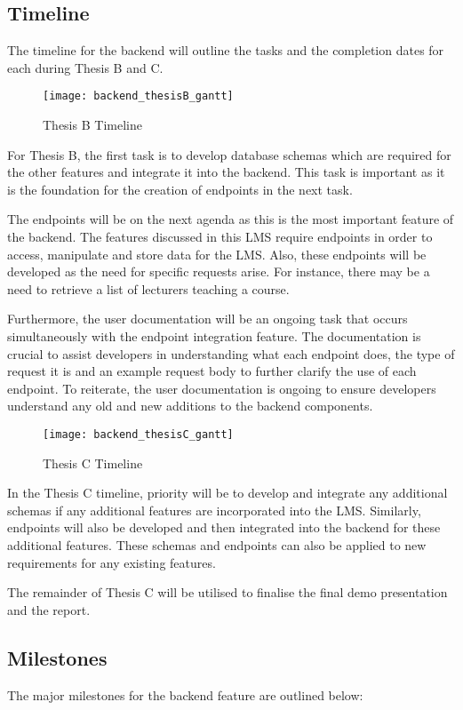\subsection{Timeline}
The timeline for the backend will outline the tasks and the completion dates for each during Thesis B and C.

\begin{figure}[h!]
    \centering
    \texttt{[image: backend\_thesisB\_gantt]}
    \caption{Thesis B Timeline}
\end{figure}

For Thesis B, the first task is to develop database schemas which are required for the other features and integrate 
it into the backend. This task is important as it is the foundation for the creation of endpoints in the next task. 

The endpoints will be on the next agenda as this is the most important feature of the backend. The features discussed 
in this LMS require endpoints in order to access, manipulate and store data for the LMS. Also, these endpoints will be 
developed as the need for specific requests arise. For instance, there may be a need to retrieve a list of lecturers teaching a course.

Furthermore, the user documentation will be an ongoing task that occurs simultaneously with the endpoint integration feature. 
The documentation is crucial to assist developers in understanding what each endpoint does, the type of request it is and an
example request body to further clarify the use of each endpoint. To reiterate, the user documentation is ongoing to ensure 
developers understand any old and new additions to the backend components. 

\begin{figure}[h!]
    \centering
    \texttt{[image: backend\_thesisC\_gantt]}
    \caption{Thesis C Timeline}
\end{figure}

In the Thesis C timeline, priority will be to develop and integrate any additional schemas if any additional features 
are incorporated into the LMS. Similarly, endpoints will also be developed and then integrated into the backend for 
these additional features. These schemas and endpoints can also be applied to new requirements for any existing features. 

The remainder of Thesis C will be utilised to finalise the final demo presentation and the report. 

\newpage
\subsection{Milestones}
The major milestones for the backend feature are outlined below: 

